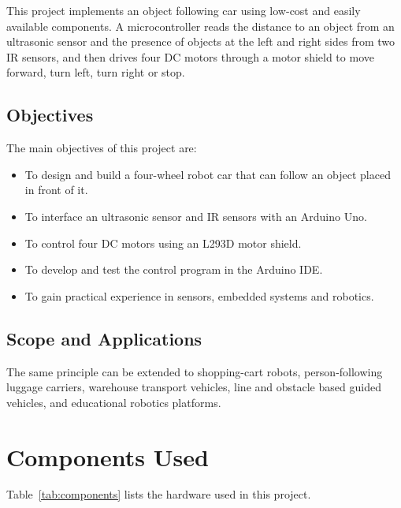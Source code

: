 \documentclass[12pt,a4paper]{article}
\begin{document}
This project implements an object following car using low-cost and easily available components. A microcontroller reads the distance to an object from an ultrasonic sensor and the presence of objects at the left and right sides from two IR sensors, and then drives four DC motors through a motor shield to move forward, turn left, turn right or stop.

\subsection{Objectives}
The main objectives of this project are:
\begin{itemize}
  \item To design and build a four-wheel robot car that can follow an object placed in front of it.
  \item To interface an ultrasonic sensor and IR sensors with an Arduino Uno.
  \item To control four DC motors using an L293D motor shield.
  \item To develop and test the control program in the Arduino IDE.
  \item To gain practical experience in sensors, embedded systems and robotics.
\end{itemize}

\subsection{Scope and Applications}
The same principle can be extended to shopping-cart robots, person-following luggage carriers, warehouse transport vehicles, line and obstacle based guided vehicles, and educational robotics platforms.

\section{Components Used}
Table~\ref{tab:components} lists the hardware used in this project.
\end{document}
